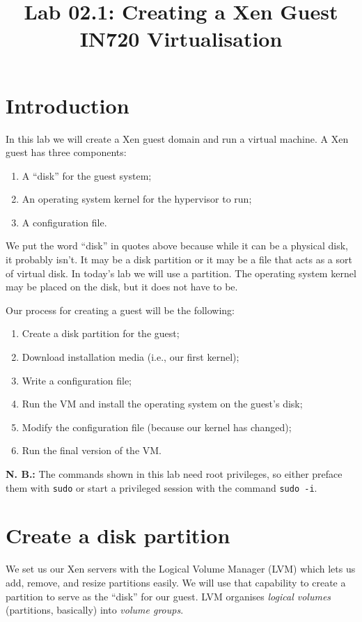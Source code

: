 \documentclass{article}
\begin{document}
\title{Lab 02.1: Creating a Xen Guest\\ IN720 Virtualisation}
\date{}
\maketitle

\section*{Introduction}
In this lab we will create a Xen guest domain and run a virtual machine.  A Xen guest has three components:

\begin{enumerate}
  \item A ``disk'' for the guest system;
  \item An operating system kernel for the hypervisor to run;
  \item A configuration file.
\end{enumerate}

We put the word ``disk'' in quotes above because while it can be a physical disk, it probably isn't. It may be a disk partition or it may be a file that acts as a sort of virtual disk. In today's lab we will use a partition. The operating system kernel may be placed on the disk, but it does not have to be.

Our process for creating a guest will be the following:

\begin{enumerate}
  \item Create a disk partition for the guest;
  \item Download installation media (i.e., our first kernel);
  \item Write a configuration file;
  \item Run the VM and install the operating system on the guest's disk;
  \item Modify the configuration file (because our kernel has changed);
  \item Run the final version of the VM.
 \end{enumerate}
 
 \textbf{N. B.:} The commands shown in this lab need root privileges, so either preface them with \texttt{sudo} or start a privileged session with the command 
 \texttt{sudo -i}.
 
 \section{Create a disk partition}
 We set us our Xen servers with the Logical Volume Manager (LVM) which lets us add, remove, and resize partitions easily. We will use that capability to create a partition to serve as the ``disk'' for our guest. LVM organises \emph{logical volumes} (partitions, basically) into \emph{volume groups}.
 
\end{document}
